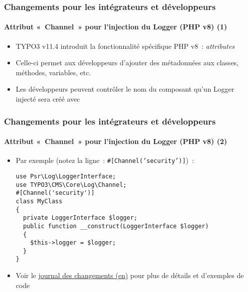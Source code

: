 %

\begin{frame}[fragile]
	\frametitle{Changements pour les intégrateurs et développeurs}
	\framesubtitle{Attribut «~Channel~» pour l'injection du Logger (PHP v8) (1)}


	\begin{itemize}
		\item TYPO3 v11.4 introduit la fonctionnalité spécifique PHP v8~: \textit{attributes}
		\item Celle-ci permet aux développeurs d'ajouter des métadonnées aux classes, méthodes, variables, etc.
		\item Les développeurs peuvent contrôler le nom du composant qu'un Logger injecté sera créé avec
	\end{itemize}

\end{frame}

\begin{frame}[fragile]
	\frametitle{Changements pour les intégrateurs et développeurs}
	\framesubtitle{Attribut «~Channel~» pour l'injection du Logger (PHP v8) (2)}


	\begin{itemize}
		\item Par exemple \small(notez la ligne~: \texttt{\#[Channel('security')]})~:\normalsize
\begin{lstlisting}
use Psr\Log\LoggerInterface;
use TYPO3\CMS\Core\Log\Channel;
#[Channel('security')]
class MyClass
{
  private LoggerInterface $logger;
  public function __construct(LoggerInterface $logger)
  {
    $this->logger = $logger;
  }
}
\end{lstlisting}
		\item Voir le
			\href{https://docs.typo3.org/c/typo3/cms-core/master/en-us/Changelog/11.4/Feature-95079-SupportPHP8StyleChannelAttributeForLoggerInjection.html}{journal des changements (en)}
			pour plus de détails et d'exemples de code
	\end{itemize}

\end{frame}

